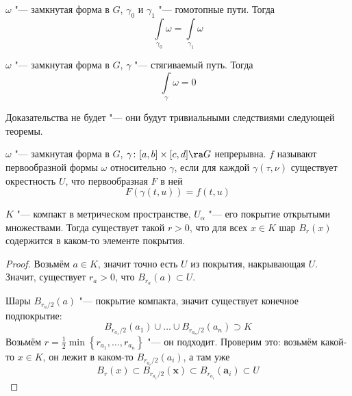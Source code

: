 \begin{theorem}
	$\omega$ "--- замкнутая форма в $G$, $\gamma_0$ и $\gamma_1$ "--- гомотопные пути.
	Тогда
	\[ \int\limits_{\gamma_0} \omega = \int\limits_{\gamma_1} \omega \]
\end{theorem}

\begin{theorem}
	$\omega$ "--- замкнутая форма в $G$, $\gamma$ "--- стягиваемый путь.
	Тогда
	\[ \int\limits_\gamma \omega = 0 \]
\end{theorem}

Доказательства не будет "--- они будут тривиальными следствиями следующей теоремы.

\begin{Def}
	$\omega$ "--- замкнутая форма в $G$, $\gamma\colon [a, b] \times [c, d] \ra G$ непрерывна.
	$f$ называют первообразной формы $\omega$ относительно $\gamma$, если для каждой $\gamma(\tau, \nu)$
	существует окрестность $U$, что первообразная $F$ в ней
	\[ F(\gamma(t, u)) = f(t, u) \]
\end{Def}

\begin{lemma}[Лебега]
	$K$ "--- компакт в метрическом пространстве, $U_\alpha$ "--- его покрытие открытыми множествами.
	Тогда существует такой $r > 0$, что для всех $x \in K$ шар $B_r(x)$ содержится в каком-то элементе покрытия.
\end{lemma}
\begin{proof}
	Возьмём $a \in K$, значит точно есть $U$ из покрытия, накрывающая $U$.
	Значит, существует $r_a > 0$, что $B_{r_a}(a) \subset U$.

	Шары $B_{r_a / 2}(a)$ "--- покрытие компакта, значит существует конечное подпокрытие:
	\[ B_{r_{a_1} / 2}(a_1) \cup \dots \cup B_{r_{a_n} / 2}(a_n) \supset K \]
	Возьмём $r = \frac12 \min \left\{ r_{a_1}, \dots, r_{a_n} \right\}$ "--- он подходит.
	Проверим это: возьмём какой-то $x \in K$, он лежит в каком-то $B_{r_{a_i} / 2}(a_i)$,
	а там уже
	\[ B_r(x) \subset B_{r_{a_i} / 2}(\mathbf x) \subset B_{r_{a_i}}(\mathbf a_i) \subset U\]
\end{proof}

